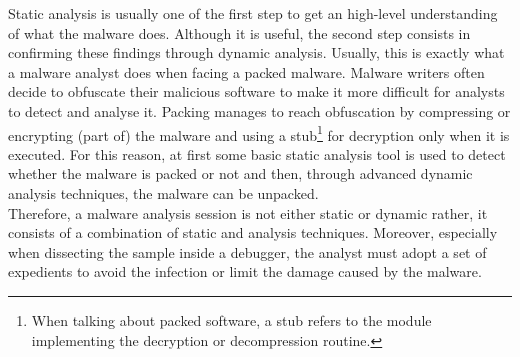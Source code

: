 \documentclass[LaM,binding=0.6cm]{sapthesis}
\begin{document}
\newpage
Static analysis is usually one of the first step to get an high-level understanding of what the malware does. Although it is useful, the second step consists in confirming these findings through dynamic analysis. Usually, this is exactly what a malware analyst does when facing a packed malware. Malware writers often decide to obfuscate their malicious software to make it more difficult for analysts to detect and analyse it. Packing manages to reach obfuscation by compressing or encrypting (part of) the malware and using a stub\footnote{When talking about packed software, a stub refers to the module implementing the decryption or decompression routine.} for decryption only when it is executed. For this reason, at first some basic static analysis tool is used to detect whether the malware is packed or not and then, through advanced dynamic analysis techniques, the malware can be unpacked.\\
Therefore, a malware analysis session is not either static or dynamic rather, it consists of a combination of static and analysis techniques. Moreover, especially when dissecting the sample inside a debugger, the analyst must adopt a set of expedients to avoid the infection or limit the damage caused by the malware.
\end{document}
